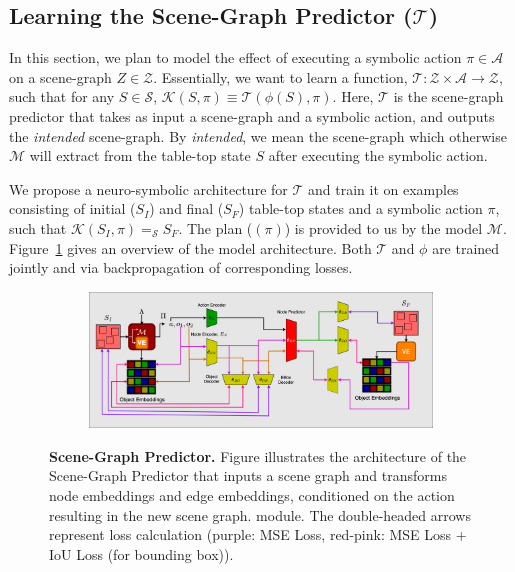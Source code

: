 \subsection{Learning the Scene-Graph Predictor ($\mathcal{T}$)}
\label{subsec:sgp}
In this section, we plan to model the effect of executing a symbolic action $\pi \in \mathcal{A}$ on a scene-graph $Z \in \mathcal{Z}$. Essentially, we want to learn a function, $\mathcal{T}: \mathcal{Z} \times \mathcal{A} \rightarrow \mathcal{Z}$, such that for any $S \in \mathcal{S}$, $\mathcal{K}(S, \pi) \equiv \mathcal{T}(\phi(S), \pi)$. Here, $\mathcal{T}$ is the scene-graph predictor that takes as input a scene-graph and a symbolic action, and outputs the \textit{intended} scene-graph. By \textit{intended}, we mean the scene-graph which otherwise $\mathcal{M}$ will extract from the table-top state $S$ after executing the symbolic action. 

We propose a neuro-symbolic architecture for $\mathcal{T}$ and train it on examples consisting of initial ($S_I$) and final ($S_F$) table-top states and a symbolic action $\pi$, such that $\mathcal{K}(S_I, \pi) =_\mathcal{S} S_F$. The plan ($(\pi)$) is provided to us by the model $\mathcal{M}$. Figure~\ref{fig:sgp} gives an overview of the model architecture. Both $\mathcal{T}$ and $\phi$ are trained jointly and via backpropagation of corresponding losses.

\begin{figure}[h!]
    \begin{subfigure}{1.0\hsize}
         \centering    
         \includegraphics[scale=0.19]{figures/sgp-7.png}
    \end{subfigure}
    \caption{
        \footnotesize{
            \textbf{Scene-Graph Predictor.}
            Figure illustrates the architecture of the Scene-Graph Predictor 
            that inputs a scene graph and transforms node embeddings and edge embeddings, conditioned on the action resulting in the new scene graph. module. The double-headed arrows represent loss calculation (purple: MSE Loss, red-pink: MSE Loss + IoU Loss (for bounding box)). 
        }
    }
    \vspace{-0.15in}
    \label{fig:sgp}
\end{figure}

